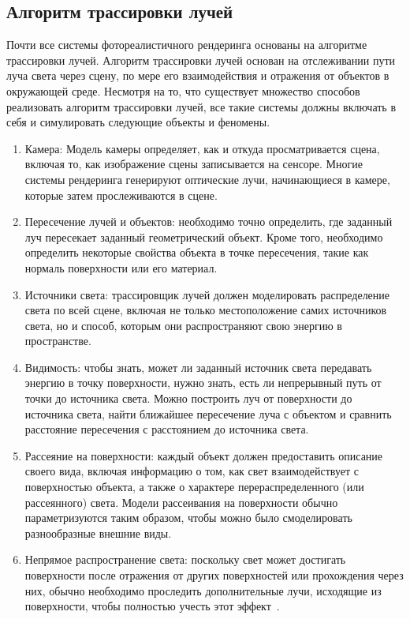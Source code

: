 \subsection{Алгоритм трассировки лучей}

Почти все системы фотореалистичного рендеринга основаны на алгоритме трассировки лучей. 
Алгоритм трассировки лучей основан на отслеживании пути луча света 
через сцену, по мере его взаимодействия и отражения от объектов в окружающей среде.
Несмотря на то, что существует множество способов реализовать алгоритм трассировки лучей, 
все такие системы должны включать в себя и симулировать следующие объекты и феномены.

\begin{enumerate}
    \item Камера: Модель камеры определяет, как и откуда просматривается сцена, включая то, как 
        изображение сцены записывается на сенсоре. Многие системы рендеринга генерируют оптические 
        лучи, начинающиеся в камере, которые затем прослеживаются в сцене.

    \item Пересечение лучей и объектов: необходимо точно определить, где заданный луч пересекает 
        заданный геометрический объект. Кроме того, необходимо определить некоторые свойства объекта 
        в точке пересечения, такие как нормаль поверхности или его материал. 

    \item Источники света: трассировщик лучей 
        должен моделировать распределение света по всей сцене, включая не только местоположение 
        самих источников света, но и способ, которым они распространяют свою энергию в пространстве.

    \item Видимость: чтобы знать, может ли заданный источник света передавать энергию в точку 
        поверхности, нужно знать, есть ли непрерывный путь от точки до источника света. 
        Можно построить луч от поверхности до источника света, найти ближайшее пересечение луча
        с объектом и сравнить расстояние пересечения с расстоянием до источника света.

    \item Рассеяние на поверхности: каждый объект должен предоставить описание своего вида, 
        включая информацию о том, как свет взаимодействует с поверхностью объекта, а также о
        характере перераспределенного (или рассеянного) света. Модели рассеивания на поверхности 
        обычно параметризуются таким образом, чтобы можно было смоделировать разнообразные внешние виды.

    \item Непрямое распространение света: поскольку свет может достигать поверхности после отражения 
        от других поверхностей или прохождения через них, обычно необходимо проследить дополнительные 
        лучи, исходящие из поверхности, чтобы полностью учесть этот эффект~\cite{PBRT3e}.
\end{enumerate}

